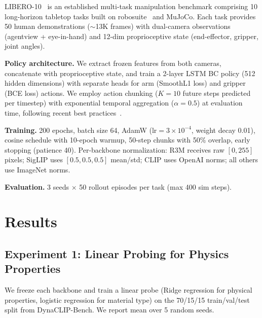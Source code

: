 \documentclass{article}
\begin{document}
LIBERO-10~\cite{liu2024libero} is an established multi-task manipulation benchmark comprising 10 long-horizon tabletop tasks built on robosuite~\cite{zhu2020robosuite} and MuJoCo. Each task provides 50 human demonstrations (${\sim}$13K frames) with dual-camera observations (agentview + eye-in-hand) and 12-dim proprioceptive state (end-effector, gripper, joint angles).

\textbf{Policy architecture.} We extract frozen features from both cameras, concatenate with proprioceptive state, and train a 2-layer LSTM BC policy (512 hidden dimensions) with separate heads for arm (SmoothL1 loss) and gripper (BCE loss) actions. We employ action chunking ($K{=}10$ future steps predicted per timestep) with exponential temporal aggregation ($\alpha{=}0.5$) at evaluation time, following recent best practices~\cite{zhao2023act,chi2023diffusion}.

\textbf{Training.} 200 epochs, batch size 64, AdamW ($\text{lr}{=}3\!\times\!10^{-4}$, weight decay 0.01), cosine schedule with 10-epoch warmup, 50-step chunks with 50\% overlap, early stopping (patience 40). Per-backbone normalization: R3M receives raw $[0,255]$ pixels; SigLIP uses $[0.5, 0.5, 0.5]$ mean/std; CLIP uses OpenAI norms; all others use ImageNet norms.

\textbf{Evaluation.} 3 seeds $\times$ 50 rollout episodes per task (max 400 sim steps).


\section{Results}
\label{sec:results}

\subsection{Experiment 1: Linear Probing for Physics Properties}
\label{sec:exp_probing}

We freeze each backbone and train a linear probe (Ridge regression for physical properties, logistic regression for material type) on the 70/15/15 train/val/test split from DynaCLIP-Bench. We report mean over 5 random seeds.
\end{document}
